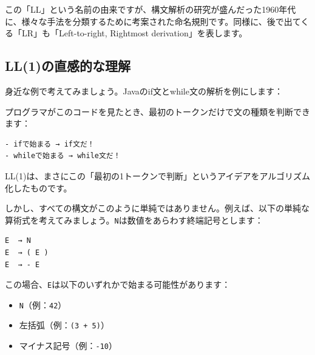 この「LL」という名前の由来ですが、構文解析の研究が盛んだった1960年代に、様々な手法を分類するために考案された命名規則です。同様に、後で出てくる「LR」も「Left-to-right,
Rightmost derivation」を表します。

\hypertarget{chapter5-ll1ux306eux76f4ux611fux7684ux306aux7406ux89e3}{%
\subsection{LL(1)の直感的な理解}\label{chapter5-ll1ux306eux76f4ux611fux7684ux306aux7406ux89e3}}

身近な例で考えてみましょう。Javaのif文とwhile文の解析を例にします：

\begin{Shaded}
\begin{Highlighting}[]
\NormalTok{) \{}
    \NormalTok{(}\NormalTok{);}
\NormalTok{\}}

\NormalTok{) \{}
\NormalTok{\}}
\end{Highlighting}
\end{Shaded}

プログラマがこのコードを見たとき、最初のトークンだけで文の種類を判断できます：

\begin{verbatim}
- ifで始まる → if文だ！
- whileで始まる → while文だ！
\end{verbatim}

LL(1)は、まさにこの「最初の1トークンで判断」というアイデアをアルゴリズム化したものです。

しかし、すべての構文がこのように単純ではありません。例えば、以下の単純な算術式を考えてみましょう。\texttt{N}は数値をあらわす終端記号とします：

\begin{verbatim}
E  → N
E  → ( E )
E  → - E
\end{verbatim}

この場合、\texttt{E}は以下のいずれかで始まる可能性があります：

\begin{itemize}
\tightlist
\item
  \texttt{N}（例：\texttt{42}）
\item
  左括弧（例：\texttt{(3\ +\ 5)}）
\item
  マイナス記号（例：\texttt{-10}）
\end{itemize}

